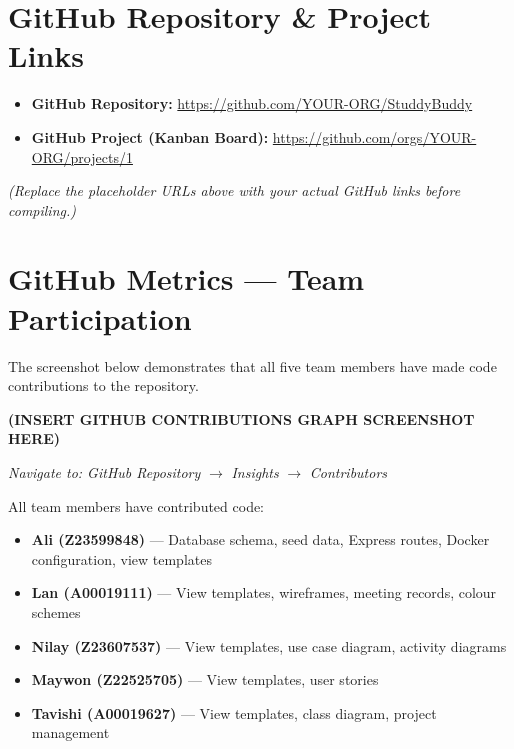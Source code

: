 \documentclass[11pt,a4paper]{article}
\begin{document}
\newpage

\section{GitHub Repository \& Project Links}

\begin{itemize}[nosep]
    \item \textbf{GitHub Repository:} \url{https://github.com/YOUR-ORG/StuddyBuddy}
    \item \textbf{GitHub Project (Kanban Board):} \url{https://github.com/orgs/YOUR-ORG/projects/1}
\end{itemize}

\textit{(Replace the placeholder URLs above with your actual GitHub links before compiling.)}

\newpage

\section{GitHub Metrics — Team Participation}

The screenshot below demonstrates that all five team members have made code contributions to the repository.



\textbf{(INSERT GITHUB CONTRIBUTIONS GRAPH SCREENSHOT HERE)}

\textit{Navigate to: GitHub Repository} $\rightarrow$ \textit{Insights} $\rightarrow$ \textit{Contributors}

All team members have contributed code:
\begin{itemize}[nosep]
    \item \textbf{Ali (Z23599848)} — Database schema, seed data, Express routes, Docker configuration, view templates
    \item \textbf{Lan (A00019111)} — View templates, wireframes, meeting records, colour schemes
    \item \textbf{Nilay (Z23607537)} — View templates, use case diagram, activity diagrams
    \item \textbf{Maywon (Z22525705)} — View templates, user stories
    \item \textbf{Tavishi (A00019627)} — View templates, class diagram, project management
\end{itemize}
\end{document}
